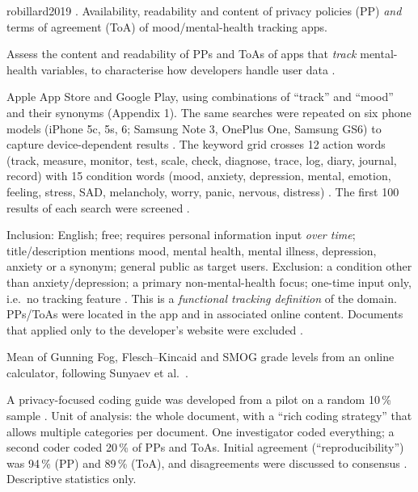 \begin{papercard}{robillard2019}
   . Availability, readability and content of privacy policies (PP) \emph{and} terms of agreement (ToA) of mood/mental-health tracking apps.

 Assess the content and readability of PPs and ToAs of apps that \emph{track} mental-health variables, to characterise how developers handle user data .

 Apple App Store and Google Play, using combinations of ``track'' and ``mood'' and their synonyms (Appendix 1). The same searches were repeated on six phone models (iPhone 5c, 5s, 6; Samsung Note 3, OnePlus One, Samsung GS6) to capture device-dependent results . The keyword grid crosses 12 action words (track, measure, monitor, test, scale, check, diagnose, trace, log, diary, journal, record) with 15 condition words (mood, anxiety, depression, mental, emotion, feeling, stress, SAD, melancholy, worry, panic, nervous, distress) . The first 100 results of each search were screened .

 Inclusion: English; free; requires personal information input \emph{over time}; title/description mentions mood, mental health, mental illness, depression, anxiety or a synonym; general public as target users. Exclusion: a condition other than anxiety/depression; a primary non-mental-health focus; one-time input only, i.e.\ no tracking feature . This is a \emph{functional tracking definition} of the domain. PPs/ToAs were located in the app and in associated online content. Documents that applied only to the developer's website were excluded .

 Mean of Gunning Fog, Flesch--Kincaid and SMOG grade levels from an online calculator, following Sunyaev et al.\ .

 A privacy-focused coding guide was developed from a pilot on a random 10\,\% sample . Unit of analysis: the whole document, with a ``rich coding strategy'' that allows multiple categories per document. One investigator coded everything; a second coder coded 20\,\% of PPs and ToAs. Initial agreement (``reproducibility'') was 94\,\% (PP) and 89\,\% (ToA), and disagreements were discussed to consensus . Descriptive statistics only.


\end{papercard}
